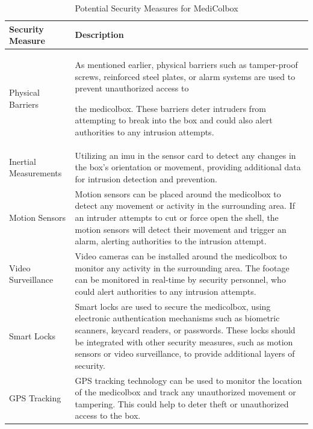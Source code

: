 \documentclass[../main.tex]{subfiles}
\begin{document}
\begin{table}[htbp]
    \centering
    \caption{Potential Security Measures for MediColbox}
    \label{tab:PotentialSecurityMeasuresForMediColbox}
    \begin{tabular}{|l|p{10cm}|} \hline
        \textbf{Security Measure} & \textbf{Description} \\ \hline
        
        Physical Barriers &
        As mentioned earlier,
        physical barriers such as tamper-proof screws,
        reinforced steel plates,
        or alarm systems are used to prevent unauthorized access to
        
        the \gls{medicolbox}.
        These barriers deter intruders from attempting to
        break into the box and could also alert authorities to
        any intrusion attempts. \\ \hline
        
        Inertial Measurements &
        Utilizing an \gls{imu} in the
        sensor card to detect any changes in the box's orientation or
        movement, providing additional data for
        intrusion detection and prevention. \\ \hline
        
        Motion Sensors &
        Motion sensors can be placed around the
        \gls{medicolbox} to detect any movement or
        activity in the surrounding area.
        If an intruder attempts to cut or force open the shell,
        the motion sensors will detect their movement and
        trigger an alarm,
        alerting authorities to the intrusion attempt. \\ \hline
        
        Video Surveillance &
        Video cameras can be installed around the \gls{medicolbox} to monitor any activity in the surrounding area. The footage can be monitored in real-time by security personnel, who could alert authorities to any intrusion attempts. \\ \hline

        Smart Locks &
        Smart locks are used to secure the \gls{medicolbox}, using electronic authentication mechanisms such as biometric scanners, keycard readers, or passwords. These locks should be integrated with other security measures, such as motion sensors or video surveillance, to provide additional layers of security. \\ \hline
        
        GPS Tracking &
        GPS tracking technology can be used to monitor the location of the \gls{medicolbox} and track any unauthorized movement or tampering. This could help to deter theft or unauthorized access to the box. \\ \hline
    \end{tabular}
\end{table}
\end{document}
